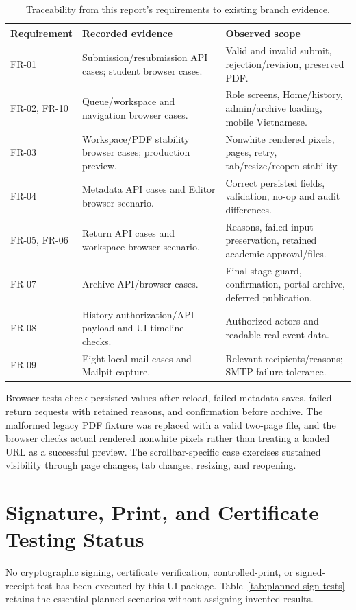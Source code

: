 \documentclass[11pt,a4paper]{report}
\begin{document}
\begin{table}[htbp]
\centering\small
\begin{tabularx}{\textwidth}{@{}l Y Y@{}}
\toprule
\textbf{Requirement} & \textbf{Recorded evidence} & \textbf{Observed scope} \\
\midrule
FR-01 & Submission/resubmission API cases; student browser cases. & Valid and invalid submit, rejection/revision, preserved PDF. \\
FR-02, FR-10 & Queue/workspace and navigation browser cases. & Role screens, Home/history, admin/archive loading, mobile Vietnamese. \\
FR-03 & Workspace/PDF stability browser cases; production preview. & Nonwhite rendered pixels, pages, retry, tab/resize/reopen stability. \\
FR-04 & Metadata API cases and Editor browser scenario. & Correct persisted fields, validation, no-op and audit differences. \\
FR-05, FR-06 & Return API cases and workspace browser scenario. & Reasons, failed-input preservation, retained academic approval/files. \\
FR-07 & Archive API/browser cases. & Final-stage guard, confirmation, portal archive, deferred publication. \\
FR-08 & History authorization/API payload and UI timeline checks. & Authorized actors and readable real event data. \\
FR-09 & Eight local mail cases and Mailpit capture. & Relevant recipients/reasons; SMTP failure tolerance. \\
\bottomrule
\end{tabularx}
\caption{Traceability from this report's requirements to existing branch evidence.}
\label{tab:traceability}
\end{table}

Browser tests check persisted values after reload, failed metadata saves, failed return requests with retained reasons, and confirmation before archive. The malformed legacy PDF fixture was replaced with a valid two-page file, and the browser checks actual rendered nonwhite pixels rather than treating a loaded URL as a successful preview. The scrollbar-specific case exercises sustained visibility through page changes, tab changes, resizing, and reopening.

\section{Signature, Print, and Certificate Testing Status}
No cryptographic signing, certificate verification, controlled-print, or signed-receipt test has been executed by this UI package. Table~\ref{tab:planned-sign-tests} retains the essential planned scenarios without assigning invented results.
\end{document}
